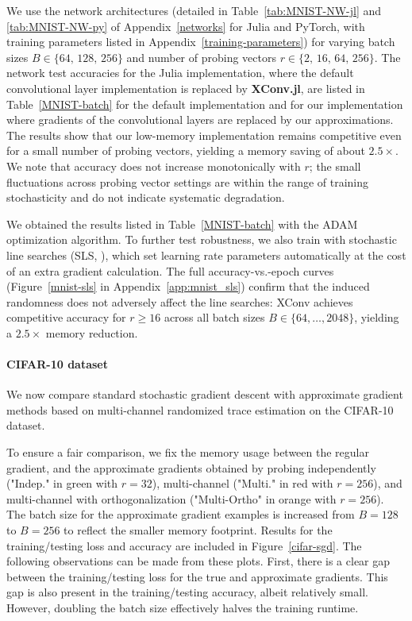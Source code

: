 \documentclass[10pt]{article}
\begin{document}
We use the network architectures (detailed in Table~\ref{tab:MNIST-NW-jl} and \ref{tab:MNIST-NW-py} of Appendix~\ref{networks} for Julia and PyTorch, with training parameters listed in Appendix~\ref{training-parameters}) for varying batch sizes $B \in \{64,\,128,\,256\}$ and number of probing vectors $r \in \{2,\,16,\,64,\,256\}$. The network test accuracies for the Julia implementation, where the default convolutional layer implementation is replaced by \textbf{XConv.jl}, are listed in Table~\ref{MNIST-batch} for the default implementation and for our implementation where gradients of the convolutional layers are replaced by our approximations. The results show that our low-memory implementation remains competitive even for a small number of probing vectors, yielding a memory saving of about $2.5\times$. We note that accuracy does not increase monotonically with $r$; the small fluctuations across probing vector settings are within the range of training stochasticity and do not indicate systematic degradation.

We obtained the results listed in Table~\ref{MNIST-batch} with the ADAM~\citep{adam-Diederik} optimization algorithm. To further test robustness, we also train with stochastic line searches (SLS, \citep{vaswani2019painless}), which set learning rate parameters automatically at the cost of an extra gradient calculation. The full accuracy-vs.-epoch curves (Figure~\ref{mnist-sls} in Appendix~\ref{app:mnist_sls}) confirm that the induced randomness does not adversely affect the line searches: XConv achieves competitive accuracy for $r \geq 16$ across all batch sizes $B \in \{64, \ldots, 2048\}$, yielding a $2.5\times$ memory reduction.


\paragraph*{CIFAR-10 dataset}\label{cifar10}
We now compare standard stochastic gradient descent with approximate gradient methods based on multi-channel randomized trace estimation on the CIFAR-10 dataset.

To ensure a fair comparison, we fix the memory usage between the regular gradient, and the approximate gradients obtained by probing independently ("Indep." in green with $r=32$), multi-channel ("Multi." in red with $r=256$), and multi-channel with orthogonalization ("Multi-Ortho" in orange with $r=256$). The batch size for the approximate gradient examples is increased from $B=128$ to $B=256$ to reflect the smaller memory footprint. Results for the training/testing loss and accuracy are included in Figure~\ref{cifar-sgd}. The following observations can be made from these plots. First, there is a clear gap between the training/testing loss for the true and approximate gradients. This gap is also present in the training/testing accuracy, albeit relatively small. However, doubling the batch size effectively halves the training runtime.
\end{document}
